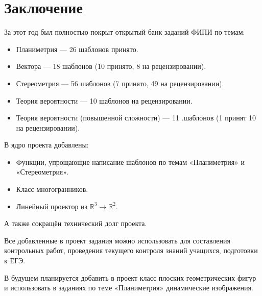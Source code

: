 \section*{Заключение}
За этот год был полностью покрыт открытый банк заданий ФИПИ по темам:
		      \begin{itemize}
			      \item Планиметрия — 26 шаблонов принято.
			      \item Вектора — 18 шаблонов (10 принято, 8 на рецензировании).
			      \item Стереометрия — 56 шаблонов (7 принято, 49 на рецензировании).
			      \item Теория вероятности — 10 шаблонов на рецензировании.
			      \item Теория вероятности (повышенной сложности) — 11 .шаблонов (1 принят 10 на рецензировании).
		      \end{itemize}

В ядро проекта добавлены: 
\begin{itemize}
    \item Функции, упрощающие написание шаблонов по темам «Планиметрия» и  «Стереометрия».
    \item Класс многогранников.
    \item Линейный проектор из $\mathbb{R}^3 \to \mathbb{R}^2$.
\end{itemize}

А также сокращён технический долг проекта.

Все добавленные в проект задания можно использовать для составления контрольных работ, проведения текущего контроля знаний учащихся, подготовки к ЕГЭ.

В будущем планируется добавить в проект класс плоских геометрических фигур и использовать в заданиях по теме «Планиметрия» динамические изображения.
